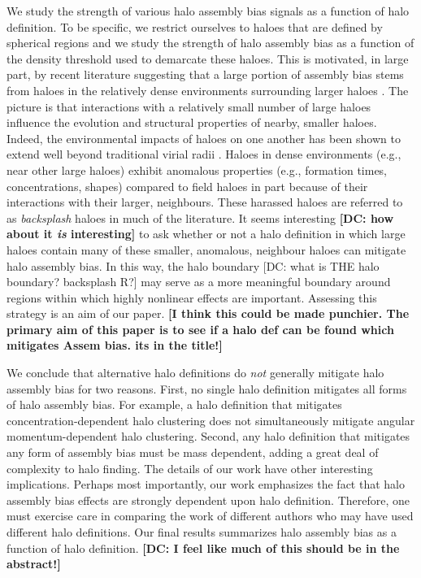 \documentclass[usenatbib,fleqn]{mnras}
\begin{document}
We study the strength of various halo assembly bias signals as a function of halo definition. To be specific, we restrict ourselves to haloes that are defined by spherical regions and we study the strength of halo assembly bias as a function of the density threshold used to demarcate these haloes. This is motivated, in large part, by recent literature suggesting that a large portion of assembly bias stems from haloes in the relatively dense environments surrounding larger haloes \citep{wang_etal07,warnick_etal08,hahn_etal09,ludlow_etal09,lacerna_padilla11,more_etal15,sunayama_etal16}. The picture is that interactions with a relatively small number of large haloes influence the evolution and structural properties of nearby, smaller haloes. Indeed, the environmental impacts of haloes on one another has been shown to extend well beyond traditional virial radii \citep{wetzel_etal14, diemer_kravtsov14, behroozi_etal13b, adhikari_etal14, wetzel_nagai15, more_etal15, hearin_etal16}. Haloes in dense environments (e.g., near other large haloes) exhibit anomalous properties (e.g., formation times, concentrations, shapes) compared to field haloes in part because of their interactions with their larger, neighbours. These harassed haloes are referred to as {\em backsplash} haloes in much of the literature. It seems interesting {\bf [DC: how about it {\em is} interesting] } to ask whether or not a halo definition in which large haloes contain many of these smaller, anomalous, neighbour haloes can mitigate halo assembly bias. In this way, the halo boundary {[DC: what is THE halo boundary?  backsplash R?]} may serve as a more meaningful boundary around regions within which highly nonlinear effects are important. Assessing this strategy is an aim of our paper. {\bf [I think this could be made punchier.  The primary aim of this paper is to see if a halo def can be found which mitigates Assem bias.  its in the title!]}

We conclude that alternative halo definitions do {\em not} generally mitigate halo assembly bias for two reasons. First, no single halo definition mitigates all forms of halo assembly bias. For example, a halo definition that mitigates concentration-dependent halo clustering does not simultaneously mitigate angular momentum-dependent halo clustering. Second, any halo definition that mitigates any form  of assembly bias must be mass dependent, adding a great deal of complexity to halo finding. The details of our work have other interesting implications. Perhaps most importantly, our work emphasizes the fact that halo assembly bias effects are strongly dependent upon halo definition. Therefore, one must exercise care in comparing the work of different authors who may have used different halo definitions. Our final results summarizes halo assembly bias as a function of halo definition. {\bf [DC: I feel like much of this should be in the abstract!]}
 
\end{document}

